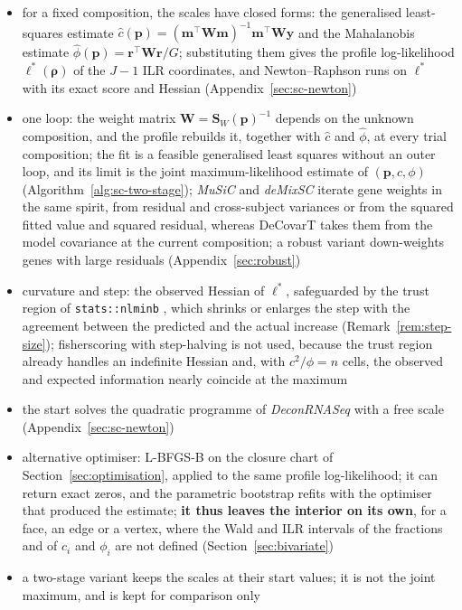 \documentclass[pdflatex, sn-nature]{sn-jnl}
\theoremstyle{thmstyleone}%
\theoremstyle{thmstyletwo}%
\theoremstyle{thmstylethree}%
\begin{document}
\begin{itemize}
  \item for a fixed composition, the scales have closed forms: the generalised least-squares estimate
        \(\hat c(\boldsymbol{p})=(\boldsymbol{m}^{\top}\boldsymbol{W}\boldsymbol{m})^{-1}\boldsymbol{m}^{\top}\boldsymbol{W}\boldsymbol{y}\) and the Mahalanobis
        estimate \(\hat\phi(\boldsymbol{p})=\boldsymbol{r}^{\top}\boldsymbol{W}\boldsymbol{r}/G\); substituting them gives the profile log-likelihood
        \(\ell^{\ast}(\boldsymbol{\rho})\) of the \(J-1\) ILR coordinates, and Newton--Raphson runs on \(\ell^{\ast}\) with its exact score and
        Hessian (Appendix~\ref{sec:sc-newton})
  \item one loop: the weight matrix \(\boldsymbol{W}=\boldsymbol{S}_{W}(\boldsymbol{p})^{-1}\) depends on the unknown composition, and the profile
        rebuilds it, together with \(\hat c\) and \(\hat\phi\), at every trial composition; the fit is a feasible generalised least
        squares without an outer loop, and its limit is the joint maximum-likelihood estimate of \((\boldsymbol{p},c,\phi)\)
        (Algorithm~\ref{alg:sc-two-stage}); \emph{MuSiC} \cite{wangBulkTissueCell2019} and \emph{deMixSC}
        \cite{guoDeMixSCDeconvolutionFramework2023} iterate gene weights in the same spirit, from residual and cross-subject variances or
        from the squared fitted value and squared residual, whereas DeCovarT takes them from the model covariance at the current
        composition; a robust variant down-weights genes with large residuals (Appendix~\ref{sec:robust})
  \item curvature and step: the observed Hessian of \(\ell^{\ast}\), safeguarded by the trust region of \texttt{stats::nlminb}
        \cite{R-base}, which shrinks or enlarges the step with the agreement between the predicted and the actual increase
        (Remark~\ref{rem:step-size}); \gls{fisherscoring} with step-halving is not used, because the trust region already handles an
        indefinite Hessian and, with \(c^{2}/\phi=n\) cells, the observed and expected information nearly coincide at the maximum
  \item the start solves the quadratic programme of \emph{DeconRNASeq} \cite{gongDeconRNASeqStatisticalFramework2013} with a free
        scale (Appendix~\ref{sec:sc-newton})
  \item alternative optimiser: L-BFGS-B on the closure chart of Section~\ref{sec:optimisation}, applied to the same profile
        log-likelihood; it can return exact zeros, and the parametric bootstrap refits with the optimiser that produced the
        estimate; \textbf{it thus leaves the interior on its own}, for a face, an edge or a vertex, where the Wald and ILR
        intervals of the fractions and of \(c_{i}\) and \(\phi_{i}\) are not defined (Section~\ref{sec:bivariate})
  \item a two-stage variant keeps the scales at their start values; it is not the joint maximum, and is kept for comparison
        only
\end{itemize}
\end{document}
